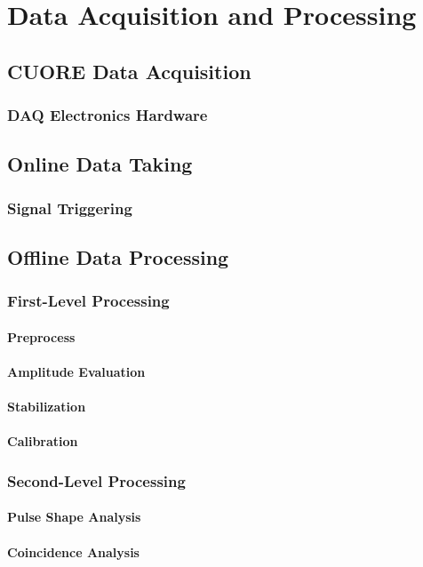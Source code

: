 \chapter{Data Acquisition and Processing}

\section{CUORE Data Acquisition}
\subsection{DAQ Electronics Hardware}

\section{Online Data Taking}
\subsection{Signal Triggering}

\section{Offline Data Processing}
\subsection{First-Level Processing}
\subsubsection{Preprocess}
\subsubsection{Amplitude Evaluation}
\subsubsection{Stabilization}
\subsubsection{Calibration}

\subsection{Second-Level Processing}
\subsubsection{Pulse Shape Analysis}
\subsubsection{Coincidence Analysis}




